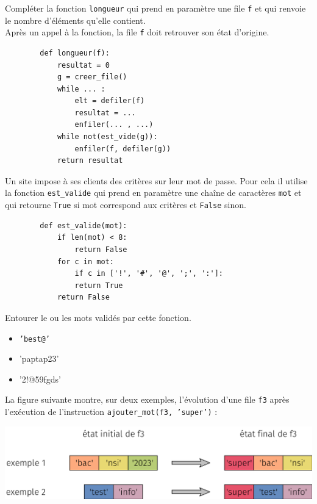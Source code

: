 \documentclass[a4paper,12pt,eval,firamath]{nsi}
\begin{document}

\question Compléter la fonction \texttt{longueur}  qui prend en
paramètre une file \texttt{f}  et qui renvoie le nombre d'éléments qu'elle contient.\\
Après un appel à la fonction, la file \texttt{f}  doit retrouver son état d'origine.\\

\begin{pyc}
      \begin{verbatim}
        def longueur(f):
            resultat = 0
            g = creer_file()
            while ... :
                elt = defiler(f)
                resultat = ...
                enfiler(... , ...)
            while not(est_vide(g)):
                enfiler(f, defiler(g))
            return resultat
    \end{verbatim}
\end{pyc}

Un site impose à ses clients des critères sur leur mot de passe. Pour cela il utilise
la fonction \texttt{est_valide}  qui prend en paramètre une chaîne de caractères \texttt{mot}  et qui retourne \texttt{True}  si mot correspond aux critères et \texttt{False}  sinon.

\begin{pyc}
      \begin{verbatim}
        def est_valide(mot):
            if len(mot) < 8:
                return False
            for c in mot:
                if c in ['!', '#', '@', ';', ':']:
                return True
            return False
    \end{verbatim}
\end{pyc}

\question Entourer le ou les mots validés par cette fonction.

\begin{itemize}
      \item \texttt{'best@'}
      \item 'paptap23'
      \item '2!@59fgds'
\end{itemize}

La figure suivante montre, sur deux exemples, l'évolution d'une file \texttt{f3}  après
l'exécution de l'instruction \texttt{ajouter_mot(f3, 'super')}  :
\begin{center}
      \includegraphics[width = 15cm]{img/fig03.png}
\end{center}
\end{document}
